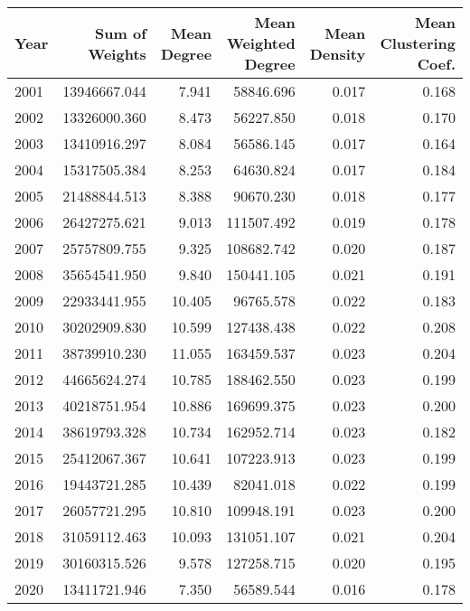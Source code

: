 \begin{tabular}{lrrrrr}
\toprule
Year & Sum of Weights & Mean Degree & Mean Weighted Degree & Mean Density & Mean Clustering Coef. \\
\midrule
2001 &   13946667.044 &       7.941 &            58846.696 &        0.017 &                 0.168 \\
2002 &   13326000.360 &       8.473 &            56227.850 &        0.018 &                 0.170 \\
2003 &   13410916.297 &       8.084 &            56586.145 &        0.017 &                 0.164 \\
2004 &   15317505.384 &       8.253 &            64630.824 &        0.017 &                 0.184 \\
2005 &   21488844.513 &       8.388 &            90670.230 &        0.018 &                 0.177 \\
2006 &   26427275.621 &       9.013 &           111507.492 &        0.019 &                 0.178 \\
2007 &   25757809.755 &       9.325 &           108682.742 &        0.020 &                 0.187 \\
2008 &   35654541.950 &       9.840 &           150441.105 &        0.021 &                 0.191 \\
2009 &   22933441.955 &      10.405 &            96765.578 &        0.022 &                 0.183 \\
2010 &   30202909.830 &      10.599 &           127438.438 &        0.022 &                 0.208 \\
2011 &   38739910.230 &      11.055 &           163459.537 &        0.023 &                 0.204 \\
2012 &   44665624.274 &      10.785 &           188462.550 &        0.023 &                 0.199 \\
2013 &   40218751.954 &      10.886 &           169699.375 &        0.023 &                 0.200 \\
2014 &   38619793.328 &      10.734 &           162952.714 &        0.023 &                 0.182 \\
2015 &   25412067.367 &      10.641 &           107223.913 &        0.023 &                 0.199 \\
2016 &   19443721.285 &      10.439 &            82041.018 &        0.022 &                 0.199 \\
2017 &   26057721.295 &      10.810 &           109948.191 &        0.023 &                 0.200 \\
2018 &   31059112.463 &      10.093 &           131051.107 &        0.021 &                 0.204 \\
2019 &   30160315.526 &       9.578 &           127258.715 &        0.020 &                 0.195 \\
2020 &   13411721.946 &       7.350 &            56589.544 &        0.016 &                 0.178 \\
\bottomrule
\end{tabular}
